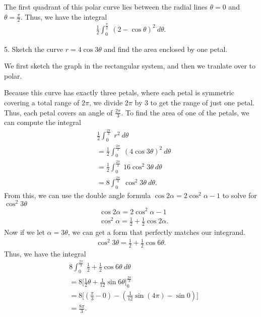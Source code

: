 \documentclass{report}
\begin{document}
    \bigbreak \noindent 
    The first quadrant of this polar curve lies between the radial lines $\theta = 0$ and $\theta = \frac{\pi}{2}$. Thus, we have the integral
    \begin{align*}
        \frac{1}{2}\int_{0}^{\frac{\pi}{2}}\ (2-\cos{\theta })^{2}\ d\theta 
    .\end{align*}

    \bigbreak \noindent 
    \begin{mdframed}
        5. Sketch the curve $r=4\cos{3\theta }$ and find the area enclosed by one petal.
    \end{mdframed}
    \bigbreak \noindent 
    We first sketch the graph in the rectangular system, and then we tranlate over to polar.
    \bigbreak \noindent 
    \begin{minipage}[]{0.47\textwidth}
    \end{minipage}
    \begin{minipage}[]{0.47\textwidth}
    \end{minipage}
    \bigbreak \noindent 
    Because this curve has exactly three petals, where each petal is symmetric covering a total range of $2\pi$, we divide $2\pi$ by 3 to get the range of just one petal. Thus, each petal covers an angle of $\frac{2\pi}{3}$. To find the area of one of the petals, we can compute the integral 
    \begin{align*}
        &\frac{1}{2}\int_{0}^{\frac{2\pi}{3}}\ r^{2}\ d\theta  \\
        &=\frac{1}{2}\int_{0}^{\frac{2\pi}{3}}\ (4\cos{3\theta })^{2}\ d\theta  \\
        &=\frac{1}{2}\int_{0}^{\frac{2\pi}{3}}\ 16\cos^{2}{3\theta}\ d\theta  \\
        &=8\int_{0}^{\frac{2\pi}{3}}\ \cos^{2}{3\theta}\ d\theta 
    .\end{align*}
    \bigbreak \noindent 
    From this, we can use the double angle formula $\cos{2\alpha} = 2\cos^{2}{\alpha}-1$ to solve for $\cos^{2}{3\theta}$
    \begin{align*}
        &\cos{2\alpha } = 2\cos^{2}{\alpha} -1 \\
        &\cos^{2}{\alpha} =\frac{1}{2} + \frac{1}{2}\cos{2\alpha}
    .\end{align*}
    \bigbreak \noindent 
    Now if we let $\alpha = 3\theta$, we can get a form that perfectly matches our integrand.
    \begin{align*}
        \cos^{2}{3\theta} = \frac{1}{2} + \frac{1}{2}\cos{6\theta}
    .\end{align*}
    Thus, we have the integral
    \begin{align*}
        &8\int_{0}^{\frac{2\pi}{3}}\ \frac{1}{2}+\frac{1}{2}\cos{6\theta }\ d\theta  \\
        &=8\bigg[\frac{1}{2}\theta +\frac{1}{12}\sin{6\theta }\bigg|_0^{\frac{2\pi}{3}} \\
        &=8\bigg[\left(\frac{\pi}{3}- 0\right) - \left(\frac{1}{12}\sin{\left(4\pi\right)}-\sin{0}\right)\bigg] \\
        &=\frac{8\pi}{3}
    .\end{align*}
\end{document}
